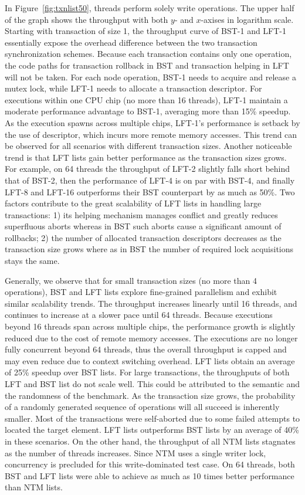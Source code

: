 \documentclass[10pt,conference,compsocconf]{IEEEtran}
\begin{document}
In Figure~\ref{fig:txnlist50}, threads perform solely write operations.
The upper half of the graph shows the throughput with both $y$- and $x$-axises in logarithm scale.
Starting with transaction of size 1, the throughput curve of BST-1 and LFT-1 essentially expose the overhead difference between the two transaction synchronization schemes.
Because each transaction contains only one operation, the code paths for transaction rollback in BST and transaction helping in LFT will not be taken.
For each node operation, BST-1 needs to acquire and release a mutex lock, while LFT-1 needs to allocate a transaction descriptor.
For executions within one CPU chip (no more than 16 threads), LFT-1 maintain a moderate performance advantage to BST-1, averaging more than 15\% speedup.
As the execution spawns across multiple chips, LFT-1's performance is setback by the use of descriptor, which incurs more remote memory accesses.
This trend can be observed for all scenarios with different transaction sizes.
Another noticeable trend is that LFT lists gain better performance as the transaction sizes grows.
For example, on 64 threads the throughput of LFT-2 slightly falls short behind that of BST-2, then the performance of LFT-4 is on par with BST-4, and finally LFT-8 and LFT-16 outperforms their BST counterpart by as much as 50\%.
Two factors contribute to the great scalability of LFT lists in handling large transactions: 1) its helping mechanism manages conflict and greatly reduces superfluous aborts whereas in BST such aborts cause a significant amount of rollbacks; 2) the number of allocated transaction descriptors decreases as the transaction size grows where as in BST the number of required lock acquisitions stays the same.

Generally, we observe that for small transaction sizes (no more than 4 operations), BST and LFT lists explore fine-grained parallelism and exhibit similar scalability trends.
The throughput increases linearly until 16 threads, and continues to increase at a slower pace until 64 threads.
Because executions beyond 16 threads span across multiple chips, the performance growth is slightly reduced due to the cost of remote memory accesses.
The executions are no longer fully concurrent beyond 64 threads, thus the overall throughput is capped and may even reduce due to context switching overhead.
LFT lists obtain an average of 25\% speedup over BST lists.
For large transactions, the throughputs of both LFT and BST list do not scale well.
This could be attributed to the semantic and the randomness of the benchmark.
As the transaction size grows, the probability of a randomly generated sequence of operations will all succeed is inherently smaller.
Most of the transactions were self-aborted due to some failed attempts to located the target element.
LFT lists outperforms BST lists by an average of 40\% in these scenarios.
On the other hand, the throughput of all NTM lists stagnates as the number of threads increases.
Since NTM uses a single writer lock, concurrency is precluded for this write-dominated test case.
On 64 threads, both BST and LFT lists were able to achieve as much as 10 times better performance than NTM lists.
\end{document}
